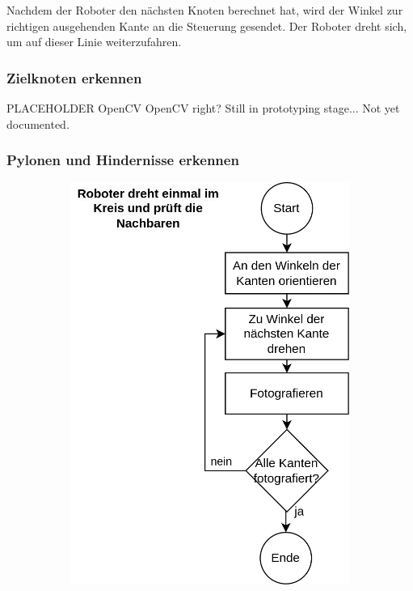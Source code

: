 Nachdem der Roboter den nächsten Knoten berechnet hat, wird der Winkel zur richtigen ausgehenden Kante an die Steuerung gesendet. Der Roboter dreht sich, um auf dieser Linie weiterzufahren.

\subsubsection{Zielknoten erkennen}

PLACEHOLDER OpenCV OpenCV right? Still in prototyping stage... Not yet documented.


\subsubsection{Pylonen und Hindernisse erkennen}

\begin{figure}[H]
\begin{subfigure}{0.45\textwidth}
\includegraphics[width=\textwidth]{assets/gesamtkonzept/ablaufdiagramm-hindernisse-erkennen.png}

\end{subfigure}
\end{figure}
